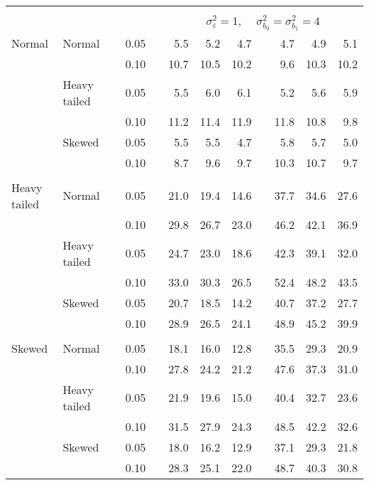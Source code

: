 \begin{table}[ht]
\begin{scriptsize}
\begin{center}
\begin{tabular}{ll p{.1cm} c p{.1cm} rrr p{.1cm} rrr}
&&&&&&&&&&&\\
& && && \multicolumn{7}{c}{$\sigma_{\varepsilon}^2 = 1$, \ \ $\sigma_{b_0}^2 = \sigma_{b_1}^2 = 4$} \\ \cline{6-12}
\rowcolor{gray!20}Normal       & Normal       && 0.05 &&   5.5 & 5.2 & 4.7 &   & 4.7 & 4.9 & 5.1 \\ 
\rowcolor{gray!20}             &              && 0.10 &&   10.7 & 10.5 & 10.2 &   & 9.6 & 10.3 & 10.2 \\ 
\rowcolor{gray!20}             & Heavy tailed && 0.05 &&   5.5 & 6.0 & 6.1 &   & 5.2 & 5.6 & 5.9 \\ 
\rowcolor{gray!20}             &              && 0.10 &&   11.2 & 11.4 & 11.9 &   & 11.8 & 10.8 & 9.8 \\ 
\rowcolor{gray!20}             & Skewed       && 0.05 &&   5.5 & 5.5 & 4.7 &   & 5.8 & 5.7 & 5.0 \\ 
\rowcolor{gray!20}             &              && 0.10 &&   8.7 & 9.6 & 9.7 &   & 10.3 & 10.7 & 9.7 \\ 
&&&&&&&&&&&\\
Heavy tailed & Normal       && 0.05 &&   21.0 & 19.4 & 14.6 &   & 37.7 & 34.6 & 27.6 \\ 
             &              && 0.10 &&   29.8 & 26.7 & 23.0 &   & 46.2 & 42.1 & 36.9 \\ 
             & Heavy tailed && 0.05 &&   24.7 & 23.0 & 18.6 &   & 42.3 & 39.1 & 32.0 \\ 
             &              && 0.10 &&   33.0 & 30.3 & 26.5 &   & 52.4 & 48.2 & 43.5 \\ 
             & Skewed       && 0.05 &&   20.7 & 18.5 & 14.2 &   & 40.7 & 37.2 & 27.7 \\ 
             &              && 0.10 &&   28.9 & 26.5 & 24.1 &   & 48.9 & 45.2 & 39.9 \\ 
&&&&&&&&&&&\\
Skewed       & Normal       && 0.05 &&   18.1 & 16.0 & 12.8 &   & 35.5 & 29.3 & 20.9 \\ 
             &              && 0.10 &&   27.8 & 24.2 & 21.2 &   & 47.6 & 37.3 & 31.0 \\ 
             & Heavy tailed && 0.05 &&   21.9 & 19.6 & 15.0 &   & 40.4 & 32.7 & 23.6 \\ 
             &              && 0.10 &&   31.5 & 27.9 & 24.3 &   & 48.5 & 42.2 & 32.6 \\ 
             & Skewed       && 0.05 &&   18.0 & 16.2 & 12.9 &   & 37.1 & 29.3 & 21.8 \\ 
             &              && 0.10 &&   28.3 & 25.1 & 22.0 &   & 48.7 & 40.3 & 30.8 \\ 

\hline
\end{tabular}
\end{center}
\end{scriptsize}
\end{table}

